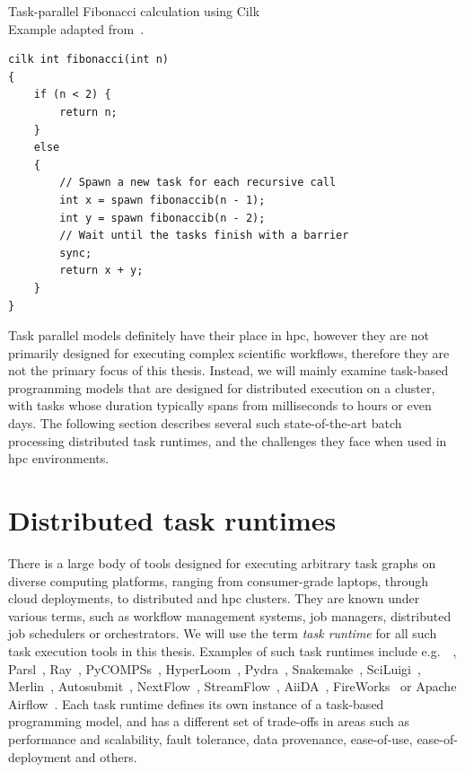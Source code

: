 \begin{listing}
	\caption{Task-parallel Fibonacci calculation using Cilk\\Example adapted from~\cite{cilk}.}
	\label{lst:cilk-fibonacci}
	\begin{verbatim}
cilk int fibonacci(int n)
{
	if (n < 2) {
		return n;
	}
	else
	{
		// Spawn a new task for each recursive call
		int x = spawn fibonaccib(n - 1);
		int y = spawn fibonaccib(n - 2);
		// Wait until the tasks finish with a barrier
		sync;
		return x + y;
	}
}
	\end{verbatim}
\end{listing}

Task parallel models definitely have their place in \gls{hpc}, however they are
not primarily designed for executing complex scientific workflows, therefore they are not the
primary focus of this thesis. Instead, we will mainly examine task-based programming models that
are designed for distributed execution on a cluster, with tasks whose duration typically spans from
milliseconds to hours or even days. The following section describes several such state-of-the-art
batch processing distributed task runtimes, and the challenges they face when used in
\gls{hpc} environments.

\section{Distributed task runtimes}
There is a large body of tools designed for executing arbitrary task graphs on diverse computing
platforms, ranging from consumer-grade laptops, through cloud deployments, to distributed and
\gls{hpc} clusters. They are known under various terms, such as workflow
management systems, job managers, distributed job schedulers or orchestrators. We will use the term
\emph{task runtime} for all such task execution tools in this thesis. Examples of such task
runtimes include e.g.\ \dask{}~\cite{dask},
Parsl~\cite{parsl}, Ray~\cite{ray},
PyCOMPSs~\cite{pycompss}, HyperLoom~\cite{hyperloom},
Pydra~\cite{pydra}, Snakemake~\cite{snakemake},
SciLuigi~\cite{sciluigi}, Merlin~\cite{merlin},
Autosubmit~\cite{autosubmit}, NextFlow~\cite{nextflow},
StreamFlow~\cite{streamflow}, AiiDA~\cite{aiida},
FireWorks~\cite{fireworks} or Apache Airflow~\cite{airfow}. Each task
runtime defines its own instance of a task-based programming model, and has a different set of
trade-offs in areas such as performance and scalability, fault tolerance, data provenance,
ease-of-use, ease-of-deployment and others.

